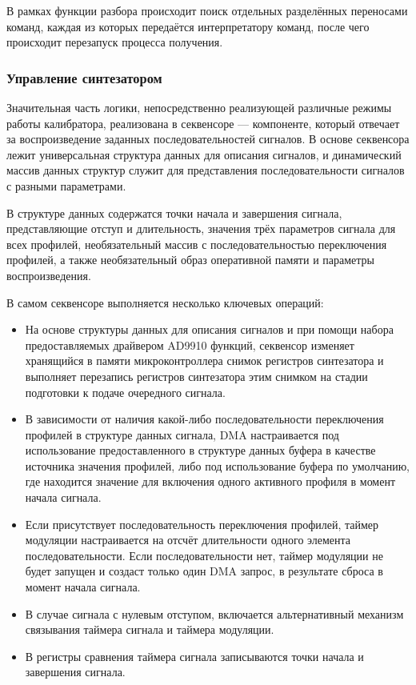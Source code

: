 \documentclass[rusmathsym, eqnumwithinsec, amspack, hyperref]{bomgost}
\begin{document}
В рамках функции разбора происходит поиск отдельных разделённых переносами команд, каждая из которых передаётся интерпретатору команд, после чего происходит перезапуск процесса получения.

\subsubsection{Управление синтезатором}

Значительная часть логики, непосредственно реализующей различные режимы работы калибратора, реализована в секвенсоре --- компоненте, который отвечает за воспроизведение заданных последовательностей сигналов. В основе секвенсора лежит универсальная структура данных для описания сигналов, и динамический массив данных структур служит для представления последовательности сигналов с разными параметрами.

В структуре данных содержатся точки начала и завершения сигнала, представляющие отступ и длительность, значения трёх параметров сигнала для всех профилей, необязательный массив с последовательностью переключения профилей, а также необязательный образ оперативной памяти и параметры воспроизведения.

В самом секвенсоре выполняется несколько ключевых операций:

\begin{itemize}
	\item На основе структуры данных для описания сигналов и при помощи набора предоставляемых драйвером AD9910 функций, секвенсор изменяет хранящийся в памяти микроконтроллера снимок регистров синтезатора и выполняет перезапись регистров синтезатора этим снимком на стадии подготовки к подаче очередного сигнала.
	\item В зависимости от наличия какой-либо последовательности переключения профилей в структуре данных сигнала, DMA настраивается под использование предоставленного в структуре данных буфера в качестве источника значения профилей, либо под использование буфера по умолчанию, где находится значение для включения одного активного профиля в момент начала сигнала.
	\item Если присутствует последовательность переключения профилей, таймер модуляции настраивается на отсчёт длительности одного элемента последовательности. Если последовательности нет, таймер модуляции не будет запущен и создаст только один DMA запрос, в результате сброса в момент начала сигнала.
	\item В случае сигнала с нулевым отступом, включается альтернативный механизм связывания таймера сигнала и таймера модуляции. 
	\item В регистры сравнения таймера сигнала записываются точки начала и завершения сигнала.
\end{itemize}
\end{document}
